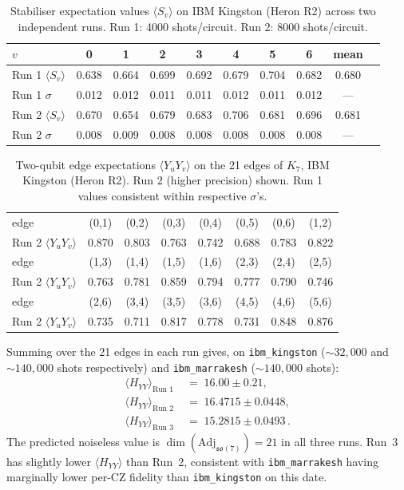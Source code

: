 \documentclass[11pt]{article}
\newcommand{\so}{\mathfrak{so}}
\newcommand{\Adj}{\mathrm{Adj}}
\begin{document}
\begin{table}[H]
\centering
\caption{Stabiliser expectation values $\langle S_v\rangle$ on IBM
Kingston (Heron R2) across two independent runs.  Run 1: 4000
shots/circuit.  Run 2: 8000 shots/circuit.}
\label{tab:heron-stabilisers}
\begin{tabular}{lccccccccr}
\toprule
$v$ & 0 & 1 & 2 & 3 & 4 & 5 & 6 & mean \\
\midrule
Run 1 $\langle S_v\rangle$ & 0.638 & 0.664 & 0.699 & 0.692 & 0.679 & 0.704 & 0.682 & 0.680 \\
Run 1 $\sigma$            & 0.012 & 0.012 & 0.011 & 0.011 & 0.012 & 0.011 & 0.012 & --- \\
\midrule
Run 2 $\langle S_v\rangle$ & 0.670 & 0.654 & 0.679 & 0.683 & 0.706 & 0.681 & 0.696 & 0.681 \\
Run 2 $\sigma$            & 0.008 & 0.009 & 0.008 & 0.008 & 0.008 & 0.008 & 0.008 & --- \\
\bottomrule
\end{tabular}
\end{table}

\begin{table}[H]
\centering
\caption{Two-qubit edge expectations $\langle Y_u Y_v\rangle$ on the
21 edges of $K_7$, IBM Kingston (Heron R2).  Run 2 (higher precision)
shown.  Run 1 values consistent within respective $\sigma$'s.}
\label{tab:heron-edges}
\begin{tabular}{lccccccc}
\toprule
edge & (0,1) & (0,2) & (0,3) & (0,4) & (0,5) & (0,6) & (1,2) \\
Run 2 $\langle Y_u Y_v\rangle$ & 0.870 & 0.803 & 0.763 & 0.742 & 0.688 & 0.783 & 0.822 \\
\midrule
edge & (1,3) & (1,4) & (1,5) & (1,6) & (2,3) & (2,4) & (2,5) \\
Run 2 $\langle Y_u Y_v\rangle$ & 0.763 & 0.781 & 0.859 & 0.794 & 0.777 & 0.790 & 0.746 \\
\midrule
edge & (2,6) & (3,4) & (3,5) & (3,6) & (4,5) & (4,6) & (5,6) \\
Run 2 $\langle Y_u Y_v\rangle$ & 0.735 & 0.711 & 0.817 & 0.778 & 0.731 & 0.848 & 0.876 \\
\bottomrule
\end{tabular}
\end{table}

\noindent
Summing over the 21 edges in each run gives, on
\texttt{ibm\_kingston} ($\sim 32{,}000$ and $\sim 140{,}000$ shots
respectively) and \texttt{ibm\_marrakesh} ($\sim 140{,}000$ shots):
\begin{align}
  \langle H_{YY}\rangle_{\text{Run 1}}
    &\;=\; 16.00 \pm 0.21, \\
  \langle H_{YY}\rangle_{\text{Run 2}}
    &\;=\; 16.4715 \pm 0.0448, \\
  \langle H_{YY}\rangle_{\text{Run 3}}
    &\;=\; \boxed{15.2815 \pm 0.0493\,}.
  \label{eq:heron-result}
\end{align}
The predicted noiseless value is $\dim(\Adj_{\so(7)}) = 21$ in
all three runs.  Run~3 has slightly lower
$\langle H_{YY}\rangle$ than Run~2, consistent with
\texttt{ibm\_marrakesh} having marginally lower per-CZ fidelity
than \texttt{ibm\_kingston} on this date.
\end{document}

